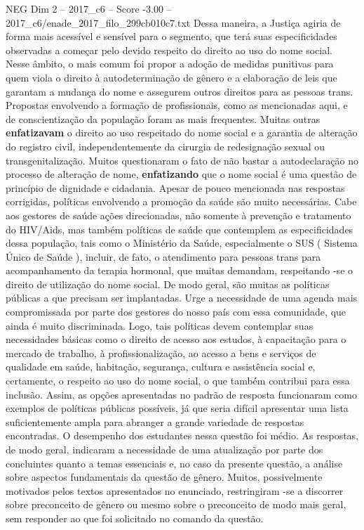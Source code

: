 \begin{textsample}{NEG Dim 2 – 2017\_c6 – Score -3.00 – 2017\_c6/enade\_2017\_filo\_299cb010c7.txt}
Dessa maneira, a Justiça agiria de forma mais acessível e sensível para o segmento, que terá suas especificidades observadas a começar pelo devido respeito do direito ao uso do nome social.
Nesse âmbito, o mais comum foi propor a adoção de medidas punitivas para quem viola o direito à autodeterminação de gênero e a elaboração de leis que garantam a mudança do nome e assegurem outros direitos para as pessoas trans.
Propostas envolvendo a formação de profissionais, como as mencionadas aqui, e de conscientização da população foram as mais frequentes.
Muitas outras \textbf{enfatizavam} o direito ao uso respeitado do nome social e a garantia de alteração do registro civil, independentemente da cirurgia de redesignação sexual ou transgenitalização.
Muitos questionaram o fato de não bastar a autodeclaração no processo de alteração de nome, \textbf{enfatizando} que o nome social é uma questão de princípio de dignidade e cidadania.
Apesar de pouco mencionada nas respostas corrigidas, políticas envolvendo a promoção da saúde são muito necessárias.
Cabe aos gestores de saúde ações direcionadas, não somente à prevenção e tratamento do HIV/Aids, mas também políticas de saúde que contemplem as especificidades dessa população, tais como o Ministério da Saúde, especialmente o SUS ( Sistema Único de Saúde ), incluir, de fato, o atendimento para pessoas trans para acompanhamento da terapia hormonal, que muitas demandam, respeitando -se o direito de utilização do nome social.
De modo geral, são muitas as políticas públicas a que precisam ser implantadas.
Urge a necessidade de uma agenda mais compromissada por parte dos gestores do nosso país com essa comunidade, que ainda é muito discriminada.
Logo, tais políticas devem contemplar suas necessidades básicas como o direito de acesso aos estudos, à capacitação para o mercado de trabalho, à profissionalização, ao acesso a bens e serviços de qualidade em saúde, habitação, segurança, cultura e assistência social e, certamente, o respeito ao uso do nome social, o que também contribui para essa inclusão.
Assim, as opções apresentadas no padrão de resposta funcionaram como exemplos de políticas públicas possíveis, já que seria difícil apresentar uma lista suficientemente ampla para abranger a grande variedade de respostas encontradas.
O desempenho dos estudantes nessa questão foi médio.
As respostas, de modo geral, indicaram a necessidade de uma atualização por parte dos concluintes quanto a temas essenciais e, no caso da presente questão, a análise sobre aspectos fundamentais da questão de gênero.
Muitos, possivelmente motivados pelos textos apresentados no enunciado, restringiram -se a discorrer sobre preconceito de gênero ou mesmo sobre o preconceito de modo mais geral, sem responder ao que foi solicitado no comando da questão.

\end{textsample}

